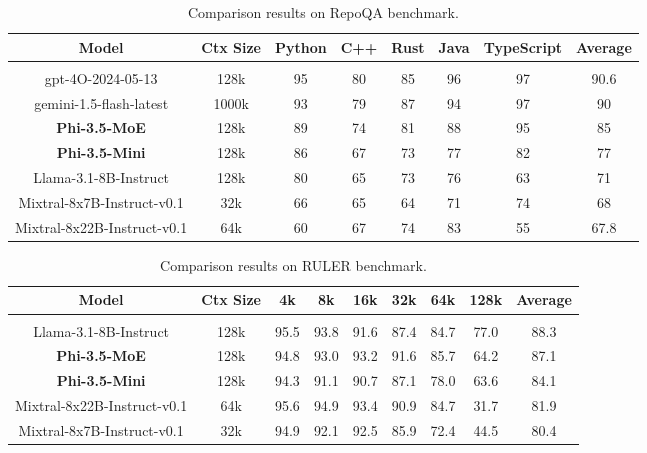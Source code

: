 \begin{table}[t]
\begin{center}
\begin{adjustbox}{width=0.7\textwidth,center}
\begin{tabular}{ cc||cccccc } 
Model & Ctx Size & Python & C++ & Rust & Java & TypeScript & Average  \\
\hline & \\[-1.5ex]
gpt-4O-2024-05-13 & 128k & 95 & 80 & 85 & 96 & 97 & 90.6 \\
gemini-1.5-flash-latest & 1000k & 93 & 79 & 87 & 94 & 97 & 90 \\
\textbf{Phi-3.5-MoE} & 128k & 89 & 74 & 81 & 88 & 95 & 85 \\
\textbf{Phi-3.5-Mini} & 128k & 86 & 67 & 73 & 77 & 82 & 77 \\
Llama-3.1-8B-Instruct & 128k & 80 & 65 & 73 & 76 & 63 & 71 \\
Mixtral-8x7B-Instruct-v0.1 & 32k & 66 & 65 & 64 & 71 & 74 & 68 \\
Mixtral-8x22B-Instruct-v0.1 & 64k & 60 & 67 & 74 & 83 & 55 & 67.8 \\
\end{tabular}
\end{adjustbox}
\end{center}
\caption{Comparison results on RepoQA benchmark.}
\label{tbl:longrepoqa}
\end{table}

\begin{table}[t]
\begin{center}
\begin{adjustbox}{width=0.7\textwidth,center}
\begin{tabular}{ cc||ccccccc } 
Model & Ctx Size & 4k & 8k & 16k & 32k & 64k & 128k & Average  \\
\hline & \\[-1.5ex]
Llama-3.1-8B-Instruct & 128k & 95.5 & 93.8 & 91.6 & 87.4 & 84.7 & 77.0 & 88.3 \\
\textbf{Phi-3.5-MoE} & 128k & 94.8 & 93.0 & 93.2 & 91.6 & 85.7 & 64.2 & 87.1 \\
\textbf{Phi-3.5-Mini} & 128k & 94.3 & 91.1 & 90.7 & 87.1 & 78.0 & 63.6 & 84.1 \\
Mixtral-8x22B-Instruct-v0.1 & 64k & 95.6 & 94.9 & 93.4 & 90.9 & 84.7 & 31.7 & 81.9 \\
Mixtral-8x7B-Instruct-v0.1 & 32k &94.9 & 92.1 &	92.5 &85.9 &72.4 & 44.5 & 80.4 \\
\end{tabular}
\end{adjustbox}
\end{center}
\caption{Comparison results on RULER benchmark.}
\label{tbl:longruler}
\end{table}

